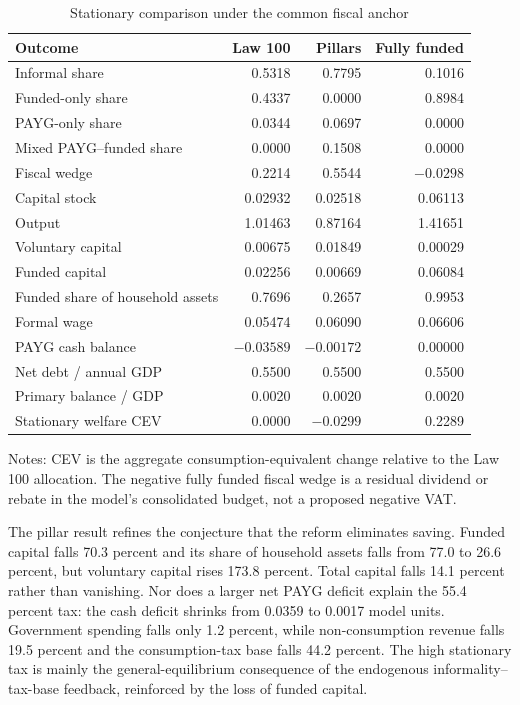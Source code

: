 \documentclass[12pt]{article}
\newcommand{\1}{\mathbf{1}}
\begin{document}
\begin{table}[htbp]\centering
\caption{Stationary comparison under the common fiscal anchor}\label{tab:steadystates}
\begin{tabular}{lrrr}
\toprule Outcome&Law 100&Pillars&Fully funded\\ \midrule
Informal share&0.5318&0.7795&0.1016\\
Funded-only share&0.4337&0.0000&0.8984\\
PAYG-only share&0.0344&0.0697&0.0000\\
Mixed PAYG--funded share&0.0000&0.1508&0.0000\\
Fiscal wedge&0.2214&0.5544&$-0.0298$\\
Capital stock&0.02932&0.02518&0.06113\\
Output&1.01463&0.87164&1.41651\\
Voluntary capital&0.00675&0.01849&0.00029\\
Funded capital&0.02256&0.00669&0.06084\\
Funded share of household assets&0.7696&0.2657&0.9953\\
Formal wage&0.05474&0.06090&0.06606\\
PAYG cash balance&$-0.03589$&$-0.00172$&0.00000\\
Net debt / annual GDP&0.5500&0.5500&0.5500\\
Primary balance / GDP&0.0020&0.0020&0.0020\\
Stationary welfare CEV&0.0000&$-0.0299$&0.2289\\
\bottomrule
\end{tabular}
\begin{flushleft}\footnotesize
Notes: CEV is the aggregate consumption-equivalent change relative to the Law 100 allocation.
The negative fully funded fiscal wedge is a residual dividend or rebate in the model's
consolidated budget, not a proposed negative VAT.
\end{flushleft}
\end{table}

The pillar result refines the conjecture that the reform eliminates saving. Funded capital
falls 70.3 percent and its share of household assets falls from 77.0 to 26.6 percent, but
voluntary capital rises 173.8 percent. Total capital falls 14.1 percent rather than vanishing.
Nor does a larger net PAYG deficit explain the 55.4 percent tax: the cash deficit shrinks from
0.0359 to 0.0017 model units. Government spending falls only 1.2 percent, while
non-consumption revenue falls 19.5 percent and the consumption-tax base falls 44.2 percent.
The high stationary tax is mainly the general-equilibrium consequence of the endogenous
informality--tax-base feedback, reinforced by the loss of funded capital.
\end{document}
